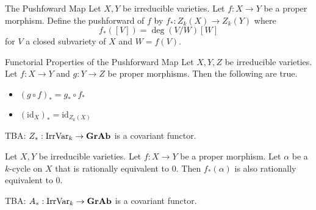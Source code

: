 \documentclass[a4paper]{article}
\begin{document}
\begin{defn}{The Pushfoward Map}{} Let $X,Y$ be irreducible varieties. Let $f:X\to Y$ be a proper morphism. Define the pushforward of $f$ by $f_\ast:Z_k(X)\to Z_k(Y)$ where $$f_\ast([V])=\deg(V/W)[W]$$ for $V$ a closed subvariety of $X$ and $W=f(V)$. 
\end{defn}

\begin{lmm}{Functorial Properties of the Pushforward Map}{} Let $X,Y,Z$ be irreducible varieties. Let $f:X\to Y$ and $g:Y\to Z$ be proper morphisms. Then the following are true. 
\begin{itemize}
\item $(g\circ f)_\ast=g_\ast\circ f_\ast$
\item $(\text{id}_X)_\ast=\text{id}_{Z_k(X)}$
\end{itemize}
\end{lmm}

TBA: $Z_\ast:\text{IrrVar}_k\to\bold{GrAb}$ is a covariant functor. 

\begin{thm}{}{} Let $X,Y$ be irreducible varieties. Let $f:X\to Y$ be a proper morphism. Let $\alpha$ be a $k$-cycle on $X$ that is rationally equivalent to $0$. Then $f_\ast(\alpha)$ is also rationally equivalent to $0$. 
\end{thm}

TBA: $A_\ast:\text{IrrVar}_k\to\bold{GrAb}$ is a covariant functor. 
\end{document}
